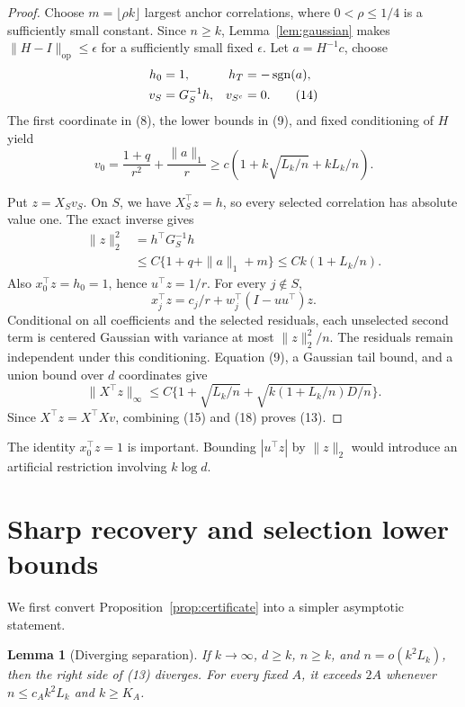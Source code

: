 \documentclass[twoside]{article}
\newtheorem{lemma}[theorem]{Lemma}
\newcommand{\sgn}{\operatorname{sgn}}
\begin{document}
\begin{proof}
Choose $m=\lfloor\rho k\rfloor$ largest anchor correlations, where $0<\rho\leq1/4$ is a sufficiently small constant. Since $n\geq k$, Lemma~\ref{lem:gaussian} makes $\|H-I\|_{\mathrm{op}}\leq\epsilon$ for a sufficiently small fixed $\epsilon$. Let $a=H^{-1}c$, choose
\begin{align}
 h_0&=1,
 &h_T&=-\sgn(a),\notag\\
 v_S&=G_S^{-1}h,
 &v_{S^c}&=0.
 \tag{14}
\end{align}
The first coordinate in (8), the lower bounds in (9), and fixed conditioning of $H$ yield \[ v_0=\frac{1+q}{r^2}+\frac{\|a\|_1}{r} \geq c(1+k\sqrt{L_k/n}+kL_k/n). \tag{15} \]

Put $z=X_Sv_S$. On $S$, we have $X_S^\top z=h$, so every selected correlation has absolute value one. The exact inverse gives
\begin{align*}
 \|z\|_2^2
 &=h^\top G_S^{-1}h\\
 &\leq C\{1+q+\|a\|_1+m\}
 \leq Ck(1+L_k/n).
 \tag{16}
\end{align*}
Also $x_0^\top z=h_0=1$, hence $u^\top z=1/r$. For every $j\notin S$, \[ x_j^\top z=c_j/r+w_j^\top(I-uu^\top)z. \tag{17} \] Conditional on all coefficients and the selected residuals, each unselected second term is centered Gaussian with variance at most $\|z\|_2^2/n$. The residuals remain independent under this conditioning. Equation (9), a Gaussian tail bound, and a union bound over $d$ coordinates give \[ \|X^\top z\|_\infty \leq C\{1+\sqrt{L_k/n}+\sqrt{k(1+L_k/n)D/n}\}. \tag{18} \] Since $X^\top z=X^\top Xv$, combining (15) and (18) proves (13).
\end{proof}

The identity $x_0^\top z=1$ is important. Bounding $|u^\top z|$ by $\|z\|_2$ would introduce an artificial restriction involving $k\log d$.

\section{Sharp recovery and selection lower bounds}
\label{sec:lower}

We first convert Proposition~\ref{prop:certificate} into a simpler asymptotic statement.

\begin{lemma}[Diverging separation]
\label{lem:ratio}
If $k\to\infty$, $d\geq k$, $n\geq k$, and $n=o(k^2L_k)$, then the right side of (13) diverges. For every fixed $A$, it exceeds $2A$ whenever $n\leq c_Ak^2L_k$ and $k\geq K_A$.
\end{lemma}
\end{document}

